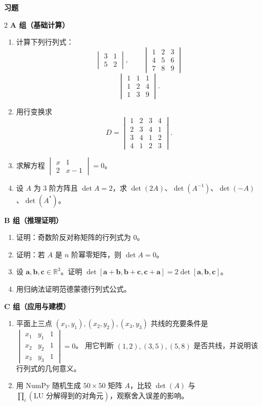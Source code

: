 \documentclass[11pt,a4paper,openany]{ctexbook}
\newcommand{\Rnum}[1]{\mathbb{R}^{#1}}
\newcommand{\exhead}{%
  \par\addvspace{12pt}%
  {\noindent\sffamily\bfseries\Large\color{qing} 习题\par}%
  \vspace{-4pt}\noindent{\color{qing!32}\rule{\linewidth}{0.7pt}}\par\vspace{6pt}}
\begin{document}
\exhead
\begin{multicols}{2}
\small
\textbf{A 组（基础计算）}
\begin{enumerate}[leftmargin=1.6em, itemsep=3pt]
\item 计算下列行列式：
      \[ \begin{vmatrix}3&1\\ 5&2\end{vmatrix},\qquad
         \begin{vmatrix}1&2&3\\ 4&5&6\\ 7&8&9\end{vmatrix} \]
      \[ \begin{vmatrix}1&1&1\\ 1&2&4\\ 1&3&9\end{vmatrix}. \]
\item 用行变换求
      \[ D=\begin{vmatrix}1&2&3&4\\ 2&3&4&1\\ 3&4&1&2\\ 4&1&2&3\end{vmatrix}. \]
\item 求解方程 $\begin{vmatrix}x&1\\ 2&x-1\end{vmatrix}=0$。
\item 设 $A$ 为 $3$ 阶方阵且 $\det A=2$，求 $\det(2A)$、$\det(A^{-1})$、$\det(-A)$、$\det(A^{*})$。
\end{enumerate}
\textbf{B 组（推理证明）}
\begin{enumerate}[leftmargin=1.6em, itemsep=3pt, start=5]
\item 证明：奇数阶反对称矩阵的行列式为 $0$。
\item 证明：若 $A$ 是 $n$ 阶幂零矩阵，则 $\det A=0$。
\item 设 $\boldsymbol{a},\boldsymbol{b},\boldsymbol{c}\in\Rnum{3}$。证明
      $\det[\boldsymbol{a}+\boldsymbol{b},\boldsymbol{b}+\boldsymbol{c},\boldsymbol{c}+\boldsymbol{a}]
       =2\det[\boldsymbol{a},\boldsymbol{b},\boldsymbol{c}]$。
\item 用归纳法证明范德蒙德行列式公式。
\end{enumerate}
\textbf{C 组（应用与建模）}
\begin{enumerate}[leftmargin=1.6em, itemsep=3pt, start=9]
\item 平面上三点 $(x_1,y_1),(x_2,y_2),(x_3,y_3)$ 共线的充要条件是
      $\begin{vmatrix}x_1&y_1&1\\ x_2&y_2&1\\ x_3&y_3&1\end{vmatrix}=0$。
      用它判断 $(1,2),(3,5),(5,8)$ 是否共线，并说明该行列式的几何意义。
\item 用 NumPy 随机生成 $50\times 50$ 矩阵 $A$，比较
      $\det(A)$ 与 $\prod_i(\text{LU 分解得到的对角元})$，观察舍入误差的影响。
\end{enumerate}
\end{multicols}
\end{document}
